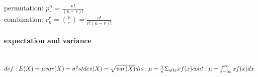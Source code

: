 \documentclass{article}
\begin{document}
permutation: $p_{r}^{n}=\frac{n!}{(n-r)!}$\\combination: $c_{n}^{r}=\binom{n}{r}=\frac{n!}{r!(n-r)!}$\paragraph{expectation and variance}\mbox{}\\
$def: E(X)=\mu\\ var(X)=\sigma^{2}\\ stdev(X)=\sqrt{var(X)}\\ dis: \mu = \frac{1}{n}\Sigma_{allx} xf(x)\\ cont: \mu = \int_{-\infty}^{\infty} xf(x)dx$

 
\end{document}
